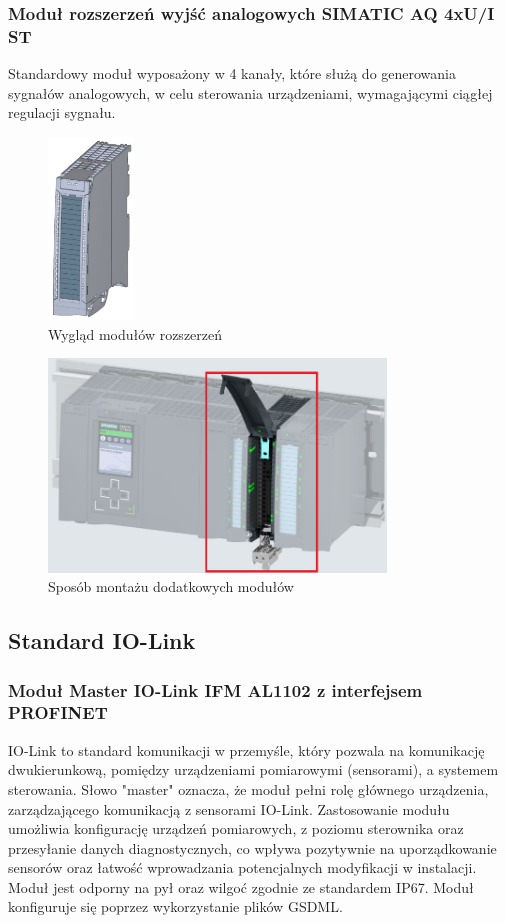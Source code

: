 \documentclass[a4paper,twoside,12pt]{book}
\begin{document}
\subsubsection{Moduł rozszerzeń wyjść analogowych SIMATIC  AQ 4xU/I ST}
Standardowy moduł wyposażony w 4 kanały, które służą do generowania sygnałów analogowych, w celu sterowania urządzeniami, wymagającymi ciągłej regulacji sygnału.

\begin{figure}[h]
	\centering
	\includegraphics[width=0.20\textwidth]{./img/module.png}
	\caption{Wygląd modułów rozszerzeń \cite{siemens}}
	\label{fig:Moduł cyfrowy}
\end{figure}

\begin{figure}[h]
	\centering
	\includegraphics[width=0.8\textwidth]{./img/multiModule.png}
	\caption{Sposób montażu dodatkowych modułów \cite{siemens}}
	\label{fig:Sposób montażu}
\end{figure}

\subsection{Standard IO-Link}
\subsubsection{Moduł Master IO-Link IFM AL1102 z interfejsem PROFINET}
IO-Link to standard komunikacji w przemyśle, który pozwala na komunikację dwukierunkową, pomiędzy urządzeniami pomiarowymi (sensorami), a systemem sterowania. Słowo "master" oznacza, że moduł pełni rolę głównego urządzenia, zarządzającego komunikacją z sensorami IO-Link. Zastosowanie modułu umożliwia konfigurację urządzeń pomiarowych, z poziomu sterownika oraz przesyłanie danych diagnostycznych, co wpływa pozytywnie na uporządkowanie sensorów oraz łatwość wprowadzania potencjalnych modyfikacji w instalacji. Moduł jest odporny na pył oraz wilgoć zgodnie ze standardem IP67. Moduł konfiguruje się poprzez wykorzystanie plików GSDML.
\end{document}
